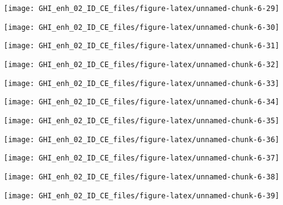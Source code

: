 \documentclass[
  10pt,
  a4paper,oneside]{article}
\begin{document}
\begin{center}\texttt{[image: GHI\_enh\_02\_ID\_CE\_files/figure-latex/unnamed-chunk-6-29]} \end{center}

\begin{center}\texttt{[image: GHI\_enh\_02\_ID\_CE\_files/figure-latex/unnamed-chunk-6-30]} \end{center}

\begin{center}\texttt{[image: GHI\_enh\_02\_ID\_CE\_files/figure-latex/unnamed-chunk-6-31]} \end{center}

\begin{center}\texttt{[image: GHI\_enh\_02\_ID\_CE\_files/figure-latex/unnamed-chunk-6-32]} \end{center}

\begin{center}\texttt{[image: GHI\_enh\_02\_ID\_CE\_files/figure-latex/unnamed-chunk-6-33]} \end{center}

\begin{center}\texttt{[image: GHI\_enh\_02\_ID\_CE\_files/figure-latex/unnamed-chunk-6-34]} \end{center}

\begin{center}\texttt{[image: GHI\_enh\_02\_ID\_CE\_files/figure-latex/unnamed-chunk-6-35]} \end{center}

\begin{center}\texttt{[image: GHI\_enh\_02\_ID\_CE\_files/figure-latex/unnamed-chunk-6-36]} \end{center}

\begin{center}\texttt{[image: GHI\_enh\_02\_ID\_CE\_files/figure-latex/unnamed-chunk-6-37]} \end{center}

\begin{center}\texttt{[image: GHI\_enh\_02\_ID\_CE\_files/figure-latex/unnamed-chunk-6-38]} \end{center}

\begin{center}\texttt{[image: GHI\_enh\_02\_ID\_CE\_files/figure-latex/unnamed-chunk-6-39]} \end{center}
\end{document}
